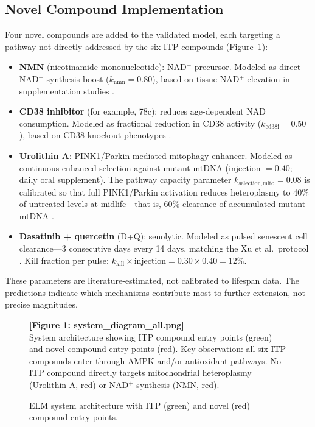 \documentclass[11pt]{article}
\begin{document}
\subsection{Novel Compound Implementation}

Four novel compounds are added to the validated model, each targeting a pathway not directly addressed by the six ITP compounds (Figure~\ref{fig:system}):

\begin{itemize}
\item \textbf{NMN} (nicotinamide mononucleotide): NAD$^+$ precursor. Modeled as direct NAD$^+$ synthesis boost ($k_{\text{nmn}} = 0.80$), based on tissue NAD$^+$ elevation in supplementation studies \citep{Mills2016,Yoshino2018}.
\item \textbf{CD38 inhibitor} (for example, 78c): reduces age-dependent NAD$^+$ consumption. Modeled as fractional reduction in CD38 activity ($k_{\text{cd38i}} = 0.50$), based on CD38 knockout phenotypes \citep{Camacho-Pereira2016}.
\item \textbf{Urolithin A}: PINK1/Parkin-mediated mitophagy enhancer. Modeled as continuous enhanced selection against mutant mtDNA (injection $= 0.40$; daily oral supplement). The pathway capacity parameter $k_{\text{selection,mito}} = 0.08$ is calibrated so that full PINK1/Parkin activation reduces heteroplasmy to 40\% of untreated levels at midlife---that is, 60\% clearance of accumulated mutant mtDNA \citep{Pickrell2015,Ryu2016}.
\item \textbf{Dasatinib + quercetin} (D+Q): senolytic. Modeled as pulsed senescent cell clearance---3 consecutive days every 14 days, matching the Xu et al.\ protocol \citep{Baker2016,Xu2018}. Kill fraction per pulse: $k_{\text{kill}} \times \text{injection} = 0.30 \times 0.40 = 12\%$.
\end{itemize}

These parameters are literature-estimated, not calibrated to lifespan data. The predictions indicate which mechanisms contribute most to further extension, not precise magnitudes.

\begin{figure}[ht]
\centering
\textbf{[Figure 1: system\_diagram\_all.png]}\\[4pt]
\small System architecture showing ITP compound entry points (green) and novel compound entry points (red). Key observation: all six ITP compounds enter through AMPK and/or antioxidant pathways. No ITP compound directly targets mitochondrial heteroplasmy (Urolithin A, red) or NAD$^+$ synthesis (NMN, red).
\caption{ELM system architecture with ITP (green) and novel (red) compound entry points.}
\label{fig:system}
\end{figure}
\end{document}
